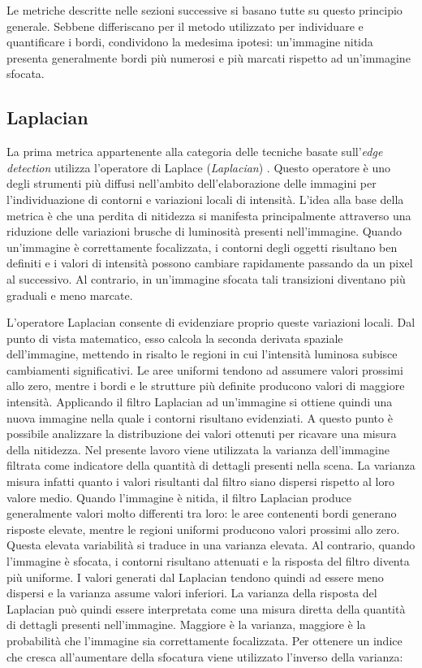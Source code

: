 \documentclass[
    target=bach,
    aauheader=,
    style=
]{thud}
\begin{document}
Le metriche descritte nelle sezioni successive si basano tutte su questo principio generale. Sebbene differiscano per il metodo utilizzato per individuare e quantificare i bordi, condividono la medesima ipotesi: un'immagine nitida presenta generalmente bordi più numerosi e più marcati rispetto ad un'immagine sfocata.

\subsection{Laplacian}

La prima metrica appartenente alla categoria delle tecniche basate sull'\textit{edge detection} utilizza l'operatore di Laplace (\textit{Laplacian}) \cite{laplacian}. Questo operatore è uno degli strumenti più diffusi nell'ambito dell'elaborazione delle immagini per l'individuazione di contorni e variazioni locali di intensità. L'idea alla base della metrica è che una perdita di nitidezza si manifesta principalmente attraverso una riduzione delle variazioni brusche di luminosità presenti nell'immagine. Quando un'immagine è correttamente focalizzata, i contorni degli oggetti risultano ben definiti e i valori di intensità possono cambiare rapidamente passando da un pixel al successivo. Al contrario, in un'immagine sfocata tali transizioni diventano più graduali e meno marcate.

L'operatore Laplacian consente di evidenziare proprio queste variazioni locali. Dal punto di vista matematico, esso calcola la seconda derivata spaziale dell'immagine, mettendo in risalto le regioni in cui l'intensità luminosa subisce cambiamenti significativi. Le aree uniformi tendono ad assumere valori prossimi allo zero, mentre i bordi e le strutture più definite producono valori di maggiore intensità. Applicando il filtro Laplacian ad un'immagine si ottiene quindi una nuova immagine nella quale i contorni risultano evidenziati. A questo punto è possibile analizzare la distribuzione dei valori ottenuti per ricavare una misura della nitidezza. Nel presente lavoro viene utilizzata la varianza dell'immagine filtrata come indicatore della quantità di dettagli presenti nella scena. La varianza misura infatti quanto i valori risultanti dal filtro siano dispersi rispetto al loro valore medio. Quando l'immagine è nitida, il filtro Laplacian produce generalmente valori molto differenti tra loro: le aree contenenti bordi generano risposte elevate, mentre le regioni uniformi producono valori prossimi allo zero. Questa elevata variabilità si traduce in una varianza elevata. Al contrario, quando l'immagine è sfocata, i contorni risultano attenuati e la risposta del filtro diventa più uniforme. I valori generati dal Laplacian tendono quindi ad essere meno dispersi e la varianza assume valori inferiori. La varianza della risposta del Laplacian può quindi essere interpretata come una misura diretta della quantità di dettagli presenti nell'immagine. Maggiore è la varianza, maggiore è la probabilità che l'immagine sia correttamente focalizzata. Per ottenere un indice che cresca all'aumentare della sfocatura viene utilizzato l'inverso della varianza:
\end{document}
